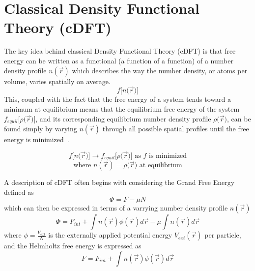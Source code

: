 \documentclass[double,12pt]{beavtex}
\begin{document}
\section{Classical Density Functional Theory (cDFT)}

The key idea behind classical Density Functional Theory (cDFT) is that 
free energy can be written as a functional (a function of a function) of 
a number density profile $n(\vec{r})$ which describes the way the number 
density, or atoms per volume, varies spatially on average. 
\begin{displaymath}{f[n(}\vec{r}{)]}\end{displaymath}
This, coupled with the fact that the free energy of a system tends toward 
a minimum at equilibrium means that the equilibrium free energy of the 
system ${f_{equil}}{[}\rho{(}\vec{r}{)]}$, and its corresponding equilibrium 
number density profile $\rho{(}\vec{r}{)}$, can be found simply by varying 
$n(\vec{r})$ through all possible spatial profiles until the free energy 
is minimized~\cite{MoritaDFT}. 

\begin{displaymath}{f[n(}\vec{r}{)]}\rightarrow{f_{equil}}{[}\rho{(}\vec{r}{)]}  \mbox{ as $f$ is minimized} \end{displaymath}
\begin{displaymath}{\mbox{where }  n(\vec{r})=\rho{(}\vec{r})  \mbox{ at equilibrium}}\end{displaymath}


A description of cDFT often begins with considering the Grand Free 
Energy defined as
\begin{equation}\Phi=F-\mu{N}\end{equation}
which can then be expressed in terms of a varrying number density 
profile $n(\vec r)$
\begin{equation}\label{GrandFE}\Phi= F_{int} +\int n(\vec{r})\phi{(\vec r)}d\vec{r}-\mu\int n(\vec r)d\vec{r}\end{equation}
where $\phi=\frac{V_{ext}}{N}$ 
is the externally 
applied potential energy $V_{ext}(\vec r)$ per particle, 
and the Helmholtz free energy is expressed as
\begin{equation}F = F_{int} + \int n(\vec{r})\phi{(\vec r)}d\vec{r}\end{equation}  
\end{document}
